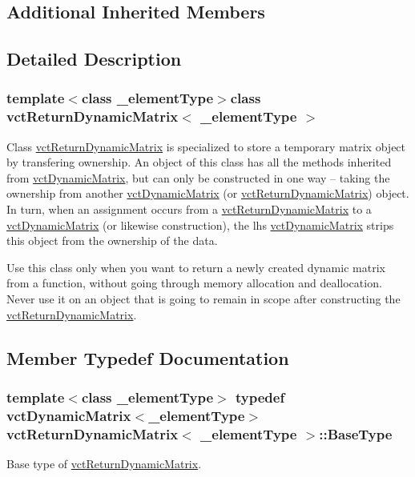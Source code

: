 \subsection*{Additional Inherited Members}


\subsection{Detailed Description}
\subsubsection*{template$<$class \+\_\+element\+Type$>$class vct\+Return\+Dynamic\+Matrix$<$ \+\_\+element\+Type $>$}

Class \hyperlink{classvct_return_dynamic_matrix}{vct\+Return\+Dynamic\+Matrix} is specialized to store a temporary matrix object by transfering ownership. An object of this class has all the methods inherited from \hyperlink{classvct_dynamic_matrix}{vct\+Dynamic\+Matrix}, but can only be constructed in one way -- taking the ownership from another \hyperlink{classvct_dynamic_matrix}{vct\+Dynamic\+Matrix} (or \hyperlink{classvct_return_dynamic_matrix}{vct\+Return\+Dynamic\+Matrix}) object. In turn, when an assignment occurs from a \hyperlink{classvct_return_dynamic_matrix}{vct\+Return\+Dynamic\+Matrix} to a \hyperlink{classvct_dynamic_matrix}{vct\+Dynamic\+Matrix} (or likewise construction), the lhs \hyperlink{classvct_dynamic_matrix}{vct\+Dynamic\+Matrix} strips this object from the ownership of the data.

Use this class only when you want to return a newly created dynamic matrix from a function, without going through memory allocation and deallocation. Never use it on an object that is going to remain in scope after constructing the \hyperlink{classvct_return_dynamic_matrix}{vct\+Return\+Dynamic\+Matrix}. 

\subsection{Member Typedef Documentation}
\hypertarget{classvct_return_dynamic_matrix_a28dcbb4e9972a46485593c2009a12ea8}{}
\subsubsection[{Base\+Type}]{\setlength{\rightskip}{0pt plus 5cm}template$<$class \+\_\+element\+Type$>$ typedef {\bf vct\+Dynamic\+Matrix}$<$\+\_\+element\+Type$>$ {\bf vct\+Return\+Dynamic\+Matrix}$<$ \+\_\+element\+Type $>$\+::{\bf Base\+Type}}\label{classvct_return_dynamic_matrix_a28dcbb4e9972a46485593c2009a12ea8}
Base type of \hyperlink{classvct_return_dynamic_matrix}{vct\+Return\+Dynamic\+Matrix}. 

